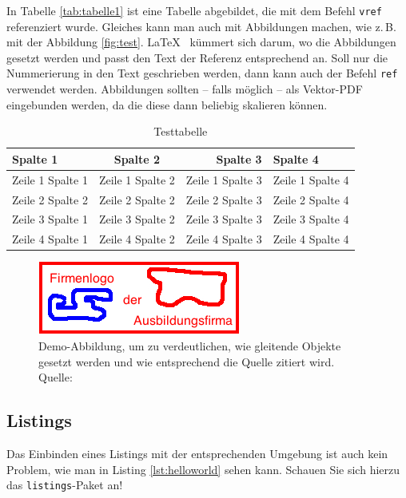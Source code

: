 In Tabelle \vref{tab:tabelle1} ist eine Tabelle abgebildet, die mit dem Befehl \texttt{vref} referenziert wurde. Gleiches kann man auch mit Abbildungen 
machen, wie z.\,B. mit der Abbildung \vref{fig:test}. \LaTeX~ kümmert sich darum, wo die Abbildungen gesetzt werden und passt den Text der Referenz entsprechend an. Soll nur die Nummerierung in den Text geschrieben werden, dann kann auch der Befehl \texttt{ref} verwendet werden.
Abbildungen sollten -- falls möglich -- als Vektor-PDF eingebunden 
werden, da die diese dann beliebig skalieren können.

\lipsum[1]
\begin{table}
	\centering
	\begin{tabular}{p{3cm}crl}
		\textbf{Spalte 1} & \textbf{Spalte 2} & \textbf{Spalte 3} & \textbf{Spalte 4}\\\toprule
		Zeile 1 Spalte 1 &  Zeile 1 Spalte 2 & Zeile 1 Spalte 3 & Zeile 1 Spalte 4\\
		Zeile 2 Spalte 2 &  Zeile 2 Spalte 2 & Zeile 2 Spalte 3 & Zeile 2 Spalte 4\\\midrule
		Zeile 3 Spalte 1 &  Zeile 3 Spalte 2 & Zeile 3 Spalte 3 & Zeile 3 Spalte 4\\
		Zeile 4 Spalte 1 &  Zeile 4 Spalte 2 & Zeile 4 Spalte 3 & Zeile 4 Spalte 4\\\bottomrule
	\end{tabular}
	\caption[Testtabelle]{\label{tab:tabelle1}Testtabelle}
\end{table}
\lipsum[1-2]

\begin{figure}
	\centering 
	\includegraphics{img/firmenlogo.jpg}
	\captionsetup{format=hang}
	\caption[Optionaler Kurztitel für das Abbildunggsverzeichnis]{\label{fig:test}Demo-Abbildung, um zu verdeutlichen, wie gleitende Objekte gesetzt werden und wie entsprechend die Quelle zitiert wird. \\Quelle: \cite[][S. 223]{TD15}}
\end{figure}
	
\subsection{Listings}	

Das Einbinden eines Listings mit der entsprechenden Umgebung ist auch kein Problem, wie man in Listing \vref{lst:helloworld} sehen kann. Schauen Sie sich hierzu das \texttt{listings}-Paket an! 
		
